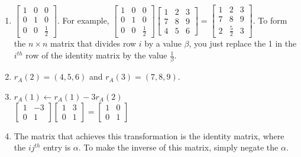 \documentclass{article}
\begin{document}
\begin{enumerate}
	\item $
	\begin{bmatrix}
		1	&0	&0\\
		0	&1	&0\\
		0	&0	&\frac{1}{2}
	\end{bmatrix}
	$. For example, $
	\begin{bmatrix}
		1	&0	&0\\
		0	&1	&0\\
		0	&0	&\frac{1}{2}
	\end{bmatrix}
	\begin{bmatrix}
		1	&2	&3\\
		7	&8	&9\\
		4	&5	&6
	\end{bmatrix}	
	=
	\begin{bmatrix}
		1	&2	&3\\
		7	&8	&9\\
		2	&\frac{5}{2}	&3
	\end{bmatrix}	
	$. To form the $n \times n$ matrix that divides row $i$ by a value $\beta$, you just replace the 1 in the $i^{th}$ row of the identity matrix by the value $\frac{1}{\beta}$. 
	
	\item $r_A(2) = (4, 5, 6)$ and $r_A(3) = (7, 8, 9)$. 
	\item $r_A(1) \leftarrow r_A(1) - 3r_A(2)$\\
	$
	\begin{bmatrix}
		1	&-3\\
		0	&1
	\end{bmatrix}
	\begin{bmatrix}
		1	&3\\
		0	&1
	\end{bmatrix}
	= 
	\begin{bmatrix}
		1	&0\\
		0	&1
	\end{bmatrix}
	$
	\item The matrix that achieves this transformation is the identity matrix, where the $ij^{th}$ entry is $\alpha$. To make the inverse of this matrix, simply negate the $\alpha$. 
	

\end{enumerate}
\end{document}
